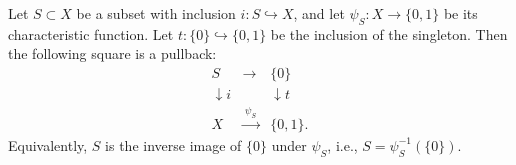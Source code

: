 Let $S \subset X$ be a subset with inclusion $i: S \hookrightarrow X$, and let $\psi_S : X \to \{0, 1\}$ be its characteristic function. Let $t : \{0\} \hookrightarrow \{0, 1\}$ be the inclusion of the singleton. Then the following square is a pullback:
$$
\begin{array}{ccc}
S & \longrightarrow & \{0\} \\[4pt]
\downarrow\scriptstyle{i} & & \downarrow\scriptstyle{t} \\[4pt]
X & \xrightarrow{\;\psi_S\;} & \{0, 1\}.
\end{array}
$$
Equivalently, $S$ is the inverse image of $\{0\}$ under $\psi_S$, i.e., $S = \psi_S^{-1}(\{0\})$.
